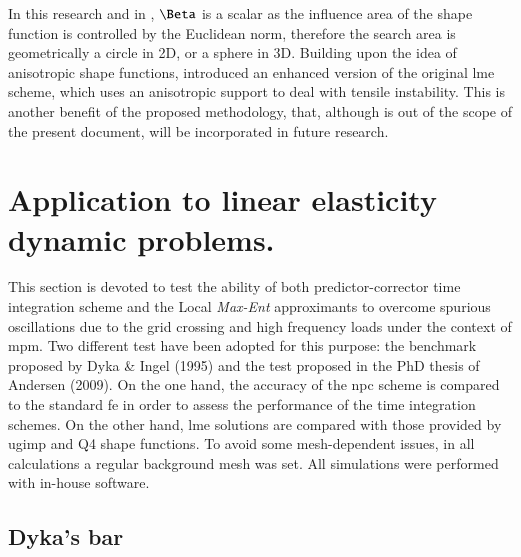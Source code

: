 \documentclass[preprint,12pt,a4paper]{elsarticle}
\begin{document}
In this research and in \cite{Arroyo2006}, $\Beta$ is a scalar as the
influence area of the shape function is controlled by the Euclidean
norm, therefore the search area is geometrically a circle in 2D, or a
sphere in 3D. Building upon the idea of anisotropic shape functions,
\cite{Kochmann2019} introduced an enhanced version of the original
\acrshort{lme} scheme, which uses an anisotropic support to deal with 
tensile instability. This is another benefit of the proposed methodology, that, although is out of the scope of the
present document, will be incorporated in future research.

\section{Application to linear elasticity dynamic problems.}
\label{sec:Application-linear-elasticity-dynamic-problems}

This section is devoted to test the ability of both predictor-corrector
time integration scheme and the Local \textit{Max-Ent} approximants to
overcome spurious oscillations due to the grid crossing and high
frequency loads under the context of \acrshort{mpm}. Two different test have
been adopted for this purpose: the benchmark proposed by Dyka \& Ingel
(1995)\cite{Dyka1995} and the test proposed in the PhD thesis of
Andersen (2009)\cite{thesis_Andersen_2009}. On the one hand, the accuracy of the \acrfull{npc}
scheme is compared to the standard \acrfull{fe} in order to assess the performance of the time integration schemes. On the other hand,  \acrshort{lme} solutions
are compared with those provided by \acrfull{ugimp} and Q4 shape
functions. To avoid some mesh-dependent issues, in all
calculations a regular background mesh was set. All simulations were
performed with in-house software.

\subsection{Dyka's bar \cite{Dyka1995}}
\label{sec:dyka-bar}
\end{document}
